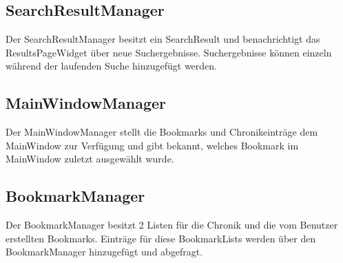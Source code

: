 \subsection*{SearchResultManager}
Der SearchResultManager besitzt ein SearchResult und benachrichtigt das ResultsPageWidget über neue Suchergebnisse. Suchergebnisse können einzeln während der laufenden Suche hinzugefügt werden.

\subsection*{MainWindowManager}
Der MainWindowManager stellt die Bookmarks und Chronikeinträge dem MainWindow zur Verfügung und gibt bekannt, welches Bookmark im MainWindow zuletzt ausgewählt wurde.

\subsection*{BookmarkManager}
Der BookmarkManager besitzt 2 Listen für die Chronik und die vom Benutzer erstellten Bookmarks. Einträge für diese BookmarkLists werden über den BookmarkManager hinzugefügt und abgefragt.
